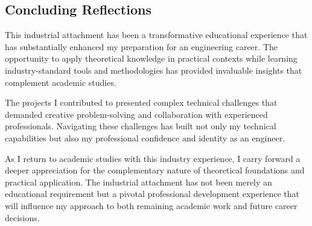 \documentclass[12pt,a4paper]{article}
\begin{document}
\subsection{Concluding Reflections}

This industrial attachment has been a transformative educational experience that has substantially enhanced my preparation for an engineering career. The opportunity to apply theoretical knowledge in practical contexts while learning industry-standard tools and methodologies has provided invaluable insights that complement academic studies.

The projects I contributed to presented complex technical challenges that demanded creative problem-solving and collaboration with experienced professionals. Navigating these challenges has built not only my technical capabilities but also my professional confidence and identity as an engineer.

As I return to academic studies with this industry experience, I carry forward a deeper appreciation for the complementary nature of theoretical foundations and practical application. The industrial attachment has not been merely an educational requirement but a pivotal professional development experience that will influence my approach to both remaining academic work and future career decisions.



\end{document}
